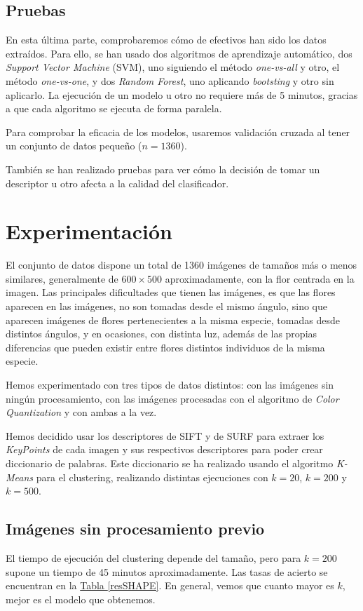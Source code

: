 \documentclass[paper=a4, fontsize=11pt]{article} %
\numberwithin{equation}{section} %
\numberwithin{figure}{section} %
\numberwithin{table}{section} %
\begin{document}
\subsection{Pruebas}

En esta última parte, comprobaremos cómo de efectivos han sido los datos extraídos. Para ello, se han usado dos algoritmos de aprendizaje automático, dos \textit{Support Vector Machine} (SVM), uno siguiendo el método \textit{one-vs-all} y otro, el método \textit{one-vs-one}, y dos \textit{Random Forest}, uno aplicando \textit{bootsting} y otro sin aplicarlo. La ejecución de un modelo u otro no requiere más de 5 minutos, gracias a que cada algoritmo se ejecuta de forma paralela.

Para comprobar la eficacia de los modelos, usaremos validación cruzada al tener un conjunto de datos pequeño ($n=1360$).

También se han realizado pruebas para ver cómo la decisión de tomar un descriptor u otro afecta a la calidad del clasificador.

\section{Experimentación}

El conjunto de datos dispone un total de 1360 imágenes de tamaños más o menos similares, generalmente de $600\times500$ aproximadamente, con la flor centrada en la imagen. Las principales dificultades que tienen las imágenes, es que las flores aparecen en las imágenes, no son tomadas desde el mismo ángulo, sino que aparecen imágenes de flores pertenecientes a la misma especie, tomadas desde distintos ángulos, y en ocasiones, con distinta luz, además de las propias diferencias que pueden existir entre flores distintos individuos de la misma especie.

Hemos experimentado con tres tipos de datos distintos: con las imágenes sin ningún procesamiento, con las imágenes procesadas con el algoritmo de \textit{Color Quantization} y con ambas a la vez.

Hemos decidido usar los descriptores de SIFT y de SURF para extraer los \textit{KeyPoints} de cada imagen y sus respectivos descriptores para poder crear diccionario de palabras. Este diccionario se ha realizado usando el algoritmo \textit{K-Means} para el clustering, realizando distintas ejecuciones con $k=20$, $k=200$ y $k=500$. 

\subsection{Imágenes sin procesamiento previo}
El tiempo de ejecución del clustering depende del tamaño, pero para $k=200$ supone un tiempo de 45 minutos aproximadamente. Las tasas de acierto se encuentran en la \hyperref[resSHAPE]{Tabla \ref*{resSHAPE}}. En general, vemos que cuanto mayor es $k$, mejor es el modelo que obtenemos. 
\end{document}
